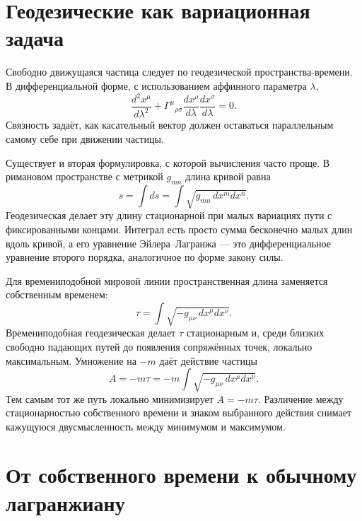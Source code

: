 \section{Геодезические как вариационная задача}

Свободно движущаяся частица следует по геодезической пространства-времени. В дифференциальной форме, с использованием аффинного параметра \(\lambda\),
\begin{equation}
\frac{d^2x^\mu}{d\lambda^2}
+\Gamma^\mu{}_{\rho\sigma}
\frac{dx^\rho}{d\lambda}
\frac{dx^\sigma}{d\lambda}=0.
\label{eq:l5-geodesic}
\end{equation}
Связность задаёт, как касательный вектор должен оставаться параллельным самому себе при движении частицы.

Существует и вторая формулировка, с которой вычисления часто проще. В римановом пространстве с метрикой \(g_{mn}\) длина кривой равна
\begin{equation}
s=\int ds
=\int\sqrt{g_{mn}\,dx^m dx^n}.
\label{eq:l5-spatial-length}
\end{equation}
Геодезическая делает эту длину стационарной при малых вариациях пути с фиксированными концами. Интеграл есть просто сумма бесконечно малых длин вдоль кривой, а его уравнение Эйлера--Лагранжа — это дифференциальное уравнение второго порядка, аналогичное по форме закону силы.

Для времениподобной мировой линии пространственная длина заменяется собственным временем:
\begin{equation}
\tau
=\int\sqrt{-g_{\mu\nu}\,dx^\mu dx^\nu}.
\label{eq:l5-proper-time-functional}
\end{equation}
Времениподобная геодезическая делает \(\tau\) стационарным и, среди близких свободно падающих путей до появления сопряжённых точек, локально максимальным. Умножение на \(-m\) даёт действие частицы
\begin{equation}
A=-m\tau
=-m\int\sqrt{-g_{\mu\nu}\,dx^\mu dx^\nu}.
\label{eq:l5-particle-action}
\end{equation}
Тем самым тот же путь локально минимизирует \(A=-m\tau\). Различение между стационарностью собственного времени и знаком выбранного действия снимает кажущуюся двусмысленность между минимумом и максимумом.

\section{От собственного времени к обычному лагранжиану}

